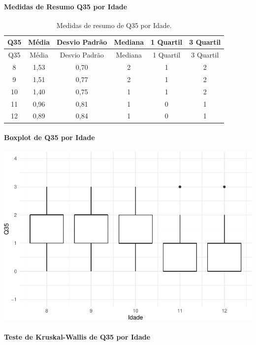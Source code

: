 \documentclass[]{article}
\let\oldparagraph\paragraph
\renewcommand{\paragraph}[1]{\oldparagraph{#1}\mbox{}}
\begin{document}
\cleardoublepage

\hypertarget{medidas-de-resumo-q35-por-idade}{%
\paragraph{Medidas de Resumo Q35 por Idade}\label{medidas-de-resumo-q35-por-idade}}

\begin{longtable}[]{@{}cccccc@{}}
\caption{\label{tab:unnamed-chunk-1275}Medidas de resumo de Q35 por Idade.}\tabularnewline
\toprule
Q35 & Média & Desvio Padrão & Mediana & 1 Quartil & 3 Quartil\tabularnewline
\midrule
\endfirsthead
\toprule
Q35 & Média & Desvio Padrão & Mediana & 1 Quartil & 3 Quartil\tabularnewline
\midrule
\endhead
8 & 1,53 & 0,70 & 2 & 1 & 2\tabularnewline
9 & 1,51 & 0,77 & 2 & 1 & 2\tabularnewline
10 & 1,40 & 0,75 & 1 & 1 & 2\tabularnewline
11 & 0,96 & 0,81 & 1 & 0 & 1\tabularnewline
12 & 0,89 & 0,84 & 1 & 0 & 1\tabularnewline
\bottomrule
\end{longtable}

\hypertarget{boxplot-de-q35-por-idade}{%
\paragraph{Boxplot de Q35 por Idade}\label{boxplot-de-q35-por-idade}}

\begin{center}\includegraphics[width=0.75\linewidth]{relatorio_covid19_files/figure-latex/unnamed-chunk-1276-1} \end{center}

\hypertarget{teste-de-kruskal-wallis-de-q35-por-idade}{%
\paragraph{Teste de Kruskal-Wallis de Q35 por Idade}\label{teste-de-kruskal-wallis-de-q35-por-idade}}
\end{document}
